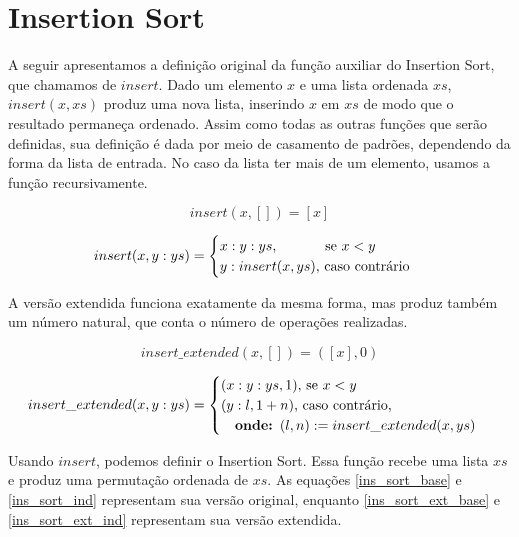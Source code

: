 \documentclass[12pt, oneside, a4paper,english,brazil]{abntex2}
\begin{document}
\section{Insertion Sort}

\qquad A seguir apresentamos a defini\c{c}\~ao original da fun\c{c}\~ao auxiliar do
Insertion Sort, que chamamos de $insert$. Dado um elemento $x$ e uma lista ordenada $xs$,
$insert(x,xs)$ produz uma nova lista, inserindo $x$ em $xs$ de modo que o resultado
permane\c{c}a ordenado. Assim como todas as outras fun\c{c}\~oes que ser\~ao definidas,
sua defini\c{c}\~ao \'e dada por meio de casamento de padr\~oes,
dependendo da forma da lista de entrada. No caso da lista ter mais de um elemento, usamos
a fun\c{c}\~ao recursivamente.

\begin{equation}
insert(x, []) = [x]
\end{equation}

\begin{equation}
insert(x, y : ys) =
  \begin{cases}
    x : y : ys \text{, \qquad\,\,\,\,\, se } x < y\\
    y : insert(x, ys) \text{, caso contr\'ario}
  \end{cases}
\end{equation}

\newpage
\qquad A vers\~ao extendida funciona exatamente da mesma forma, mas produz tamb\'em um
n\'umero natural, que conta o n\'umero de opera\c{c}\~oes realizadas.

\begin{equation}
insert\_extended(x, []) = ([x], 0)
\end{equation}

\begin{equation}
insert\_extended(x, y : ys) =
  \begin{cases}
    (x : y : ys, 1) \text{, se } x < y\\
    (y : l, 1 + n) \text{, caso contr\'ario,}\\ \text{\quad \textbf{onde: }} (l, n) := insert\_extended(x, ys)
  \end{cases}
\end{equation}

\qquad Usando $insert$, podemos definir o Insertion Sort.
Essa fun\c{c}\~ao recebe uma lista $xs$ e produz uma permuta\c{c}\~ao ordenada de $xs$.
As equa\c{c}\~oes \ref{ins_sort_base} e \ref{ins_sort_ind} representam sua vers\~ao original, enquanto
\ref{ins_sort_ext_base} e \ref{ins_sort_ext_ind} representam sua vers\~ao extendida.
\end{document}
